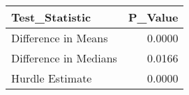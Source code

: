 \begin{table}
\centering\begingroup\fontsize{6}{8}\selectfont

\begin{tabular}{lr}
\toprule
Test\_Statistic & P\_Value\\
\midrule
Difference in Means & 0.0000\\
Difference in Medians & 0.0166\\
Hurdle Estimate & 0.0000\\
\bottomrule
\end{tabular}
\endgroup{}
\end{table}
